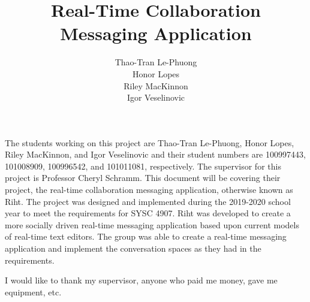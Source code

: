 \documentclass[12pt]{report}
\begin{document}
\title{Real-Time Collaboration Messaging Application}
\author{Thao-Tran Le-Phuong\\Honor Lopes\\Riley MacKinnon\\Igor Veselinovic}
 \copyrightfalse %

    \beforepreface


    The students working on this project are Thao-Tran Le-Phuong, Honor Lopes,
    Riley MacKinnon, and Igor Veselinovic and their student numbers are
    100997443, 101008909, 100996542, and 101011081, respectively. The supervisor
    for this project is Professor Cheryl Schramm. This document will be covering
    their project, the real-time collaboration messaging application, otherwise
    known as Riht. The project was designed and implemented during the 2019-2020
    school year to meet the requirements for SYSC 4907.  Riht was developed to
    create a more socially driven real-time messaging application based upon
    current models of real-time text editors. The group was able to create a
    real-time messaging application and implement the conversation spaces as
    they had in the requirements.


	I would like to thank my supervisor, anyone who paid me money, gave me
	equipment, etc.


    \prefaceTOC   %
    \prefaceLOF   %
    \prefaceLOT   %
\end{document}
